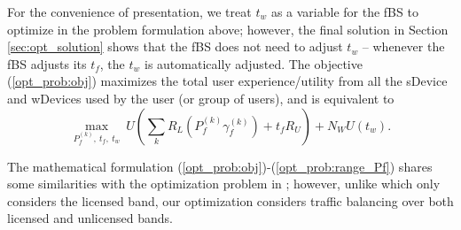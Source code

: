 \documentclass[journal,final,letterpaper,10pt,doublecolumn,twoside]{IEEEtran}
\begin{document}
For the convenience of presentation, we treat $t_w$ as a variable for the fBS to optimize in the problem formulation above;  however, the final solution in Section \ref{sec:opt_solution} shows that the fBS does not need to adjust $t_w$ -- whenever the fBS adjusts its $t_f$,  the $t_w$ is automatically adjusted.
The objective (\ref{opt_prob:obj}) maximizes the total user experience/utility from all the sDevice and wDevices used by the user (or group of users), and is equivalent to \begin{equation}
\max_{P_f^{(k)}, ~ t_f, ~t_w} ~  U \left (\sum_k R_L(P_f^{(k)}
\gamma_f^{(k)}) + t_f R_U \right )  +  N_W U(t_w ) .
\label{opt_prob:obj-simplified}
\end{equation}

The mathematical formulation (\ref{opt_prob:obj})-(\ref{opt_prob:range_Pf}) shares some similarities with the optimization problem in \cite{femto-PowerControl-2010Sundeep}; however, unlike \cite{femto-PowerControl-2010Sundeep} which only considers the licensed band, our optimization considers traffic balancing over both licensed and unlicensed bands.
\end{document}
